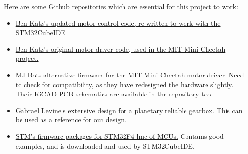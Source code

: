 \documentclass[a4paper]{article}
\begin{document}
		Here are some Github repositories which are essential for this project to work:
		\begin{itemize}
			\item \href{https://github.com/bgkatz/motorcontrol}{Ben Katz's updated motor control code, re-written to work with the STM32CubeIDE}
			\item \href{https://github.com/bgkatz/3phase_integrated}{Ben Katz's original motor driver code, used in the MIT Mini Cheetah project.}
			\item \href{https://github.com/mjbots/moteus}{MJ Bots alternative firmware for the MIT Mini Cheetah motor driver.} Need to check for compatibility, as they have redesigned the hardware slightly. Their KiCAD PCB schematics are available in the repository too.
			\item \href{https://github.com/G-Levine/OpenTorque-Actuator}{Gabrael Levine's extensive design for a planetary reliable gearbox.} This can be used as a reference for our design.
			\item \href{https://github.com/STMicroelectronics/STM32CubeF4}{STM's firmware packages for STM32F4 line of MCUs.} Contains good examples, and is downloaded and used by STM32CubeIDE.
		\end{itemize}
\end{document}
